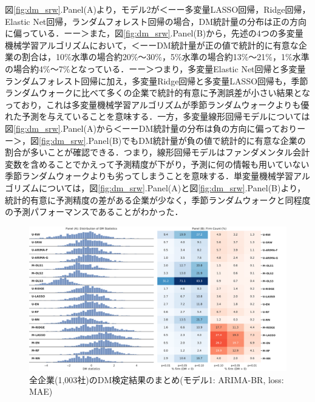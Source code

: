 \documentclass[a4paper，12pt]{jsarticle}
\begin{document}
図\ref{fig:dm_srw}.Panel(A)より，モデル2が＜ーー多変量LASSO回帰，Ridge回帰，Elastic Net回帰，ランダムフォレスト回帰の場合，DM統計量の分布は正の方向に偏っている．ーー＞また，図\ref{fig:dm_srw}.Panel(B)から，先述の4つの多変量機械学習アルゴリズムにおいて，＜ーーDM統計量が正の値で統計的に有意な企業の割合は，10\%水準の場合約20\%～30\%，5\%水準の場合約13\%～21\%，1\%水準の場合約4\%～7\%となっている．ーー＞つまり，多変量Elastic Net回帰と多変量ランダムフォレスト回帰に加え，多変量Ridge回帰と多変量LASSO回帰も，季節ランダムウォークに比べて多くの企業で統計的有意に予測誤差が小さい結果となっており，これは多変量機械学習アルゴリズムが季節ランダムウォークよりも優れた予測を与えていることを意味する．一方，多変量線形回帰モデルについては図\ref{fig:dm_srw}.Panel(A)から＜ーーDM統計量の分布は負の方向に偏っておりーー＞，図\ref{fig:dm_srw}.Panel(B)でもDM統計量が負の値で統計的に有意な企業の割合が多いことが確認できる．つまり，線形回帰モデルはファンダメンタル会計変数を含めることでかえって予測精度が下がり，予測に何の情報も用いていない季節ランダムウォークよりも劣ってしまうことを意味する．単変量機械学習アルゴリズムについては，図\ref{fig:dm_srw}.Panel(A)と図\ref{fig:dm_srw}.Panel(B)より，統計的有意に予測精度の差がある企業が少なく，季節ランダムウォークと同程度の予測パフォーマンスであることがわかった．

\begin{figure}
  \centering
  \caption{全企業(1,003社)のDM検定結果のまとめ(モデル1: ARIMA-BR, loss: MAE)}
  \label{fig:dm_sarima_br}
  \includegraphics[width=15cm]{./img/_dm_MAD_y_hat_sarima_br.pdf}
\end{figure}
\end{document}
